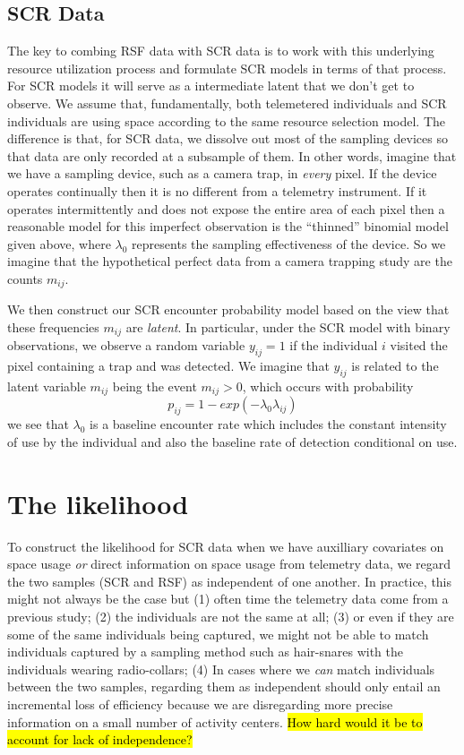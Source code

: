 \subsection{SCR Data}

The key to combing RSF data with SCR data is to work with this
underlying resource utilization process and formulate SCR models in
terms of that process. For SCR models it will serve as a intermediate
latent that we don't get to observe. We assume that, fundamentally,
both telemetered individuals and SCR individuals are using space
according to the same resource selection model. The difference is that,
for SCR data, we dissolve out most of the sampling devices so that
data are only recorded at a subsample of them.
In other words, imagine that we have a sampling device, such as a
camera trap, in {\it every} pixel. If the device operates continually
then it is no different from a telemetry instrument. If it
operates  intermittently and does not expose the entire area of
each pixel then a reasonable model for this imperfect observation is
the ``thinned'' binomial model given above, where $\lambda_{0}$
represents the sampling effectiveness of the device. So we imagine
that the hypothetical perfect data from a camera trapping study are
the counts $m_{ij}$.

We then construct our SCR encounter probability model based on the
view that these frequencies $m_{ij}$ are {\it latent}. In particular,
under the SCR model with binary observations,
 we observe a random variable
$y_{ij} = 1$  if the individual $i$ visited the pixel
containing a trap and was detected.
We imagine that $y_{ij}$ is related to the latent variable $m_{ij}$ being the
event $m_{ij}>0$, which occurs with probability
\[
 p_{ij} = 1-exp(- \lambda_{0} \lambda_{ij})
\]
we see that $\lambda_{0}$ is a baseline encounter rate which includes
the constant intensity of use by the individual and also the baseline
rate of detection conditional on use.



\section{The likelihood}

To construct the likelihood for SCR data when we have auxilliary
covariates on space usage {\it or} direct information on space usage
from telemetry data, we regard the two samples (SCR and RSF) as
independent of one another. In practice, this might not always be the
case but (1) often time the telemetry data come from a previous study;
(2) the individuals are not the same at all; (3) or even if they are
some of the same individuals being captured, we might not be able to
match individuals captured by a sampling method such as hair-snares
with the individuals wearing radio-collars; (4) In cases where we {\it
  can} match individuals between the two samples, regarding them as
independent should only entail an incremental loss of efficiency
because we are disregarding more precise information on a small number
of activity centers. \hl{How hard would it be to account for lack of independence?}

